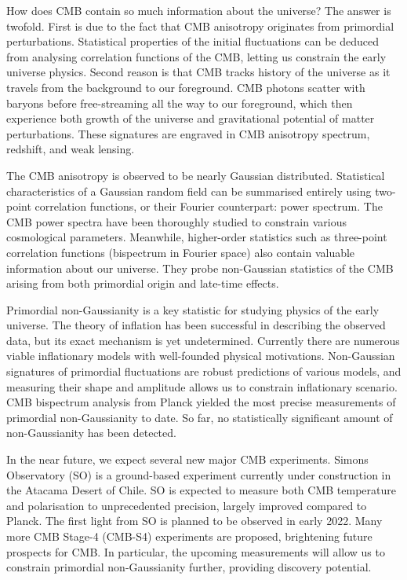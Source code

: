 How does CMB contain so much information about the universe? The answer is twofold. First is due to the fact that CMB anisotropy originates from primordial perturbations. Statistical properties of the initial fluctuations can be deduced from analysing correlation functions of the CMB, letting us constrain the early universe physics. Second reason is that CMB tracks history of the universe as it travels from the background to our foreground. CMB photons scatter with baryons before free-streaming all the way to our foreground, which then experience both growth of the universe and gravitational potential of matter perturbations. These signatures are engraved in CMB anisotropy spectrum, redshift, and weak lensing.

The CMB anisotropy is observed to be nearly Gaussian distributed. Statistical characteristics of a Gaussian random field can be summarised entirely using two-point correlation functions, or their Fourier counterpart: power spectrum. The CMB power spectra have been thoroughly studied to constrain various cosmological parameters. Meanwhile, higher-order statistics such as three-point correlation functions (bispectrum in Fourier space) also contain valuable information about our universe. They probe non-Gaussian statistics of the CMB arising from both primordial origin and late-time effects.

Primordial non-Gaussianity is a key statistic for studying physics of the early universe. The theory of inflation has been successful in describing the observed data, but its exact mechanism is yet undetermined. Currently there are numerous viable inflationary models with well-founded physical motivations. Non-Gaussian signatures of primordial fluctuations are robust predictions of various models, and measuring their shape and amplitude allows us to constrain inflationary scenario. CMB bispectrum analysis from Planck yielded the most precise measurements of primordial non-Gaussianity to date. So far, no statistically significant amount of non-Gaussianity has been detected.

In the near future, we expect several new major CMB experiments. Simons Observatory (SO) is a ground-based experiment currently under construction in the Atacama Desert of Chile. SO is expected to measure both CMB temperature and polarisation to unprecedented precision, largely improved compared to Planck. The first light from SO is planned to be observed in early 2022. Many more CMB Stage-4 (CMB-S4) experiments are proposed, brightening future prospects for CMB. In particular, the upcoming measurements will allow us to constrain primordial non-Gaussianity further, providing discovery potential.

